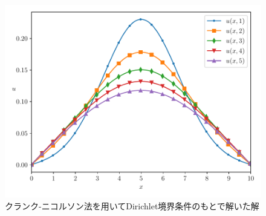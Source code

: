 \documentclass[a4j, titlepage]{jsarticle}
\numberwithin{equation}{section}
\begin{document}
            \begin{figure}[h]
                \centering
                \includegraphics[width=0.8\hsize]{kadai1/3.pdf}
                \caption{クランク-ニコルソン法を用いてDirichlet境界条件のもとで解いた解}
                \label{fig:crank_dirichlet}
            \end{figure}
\end{document}
